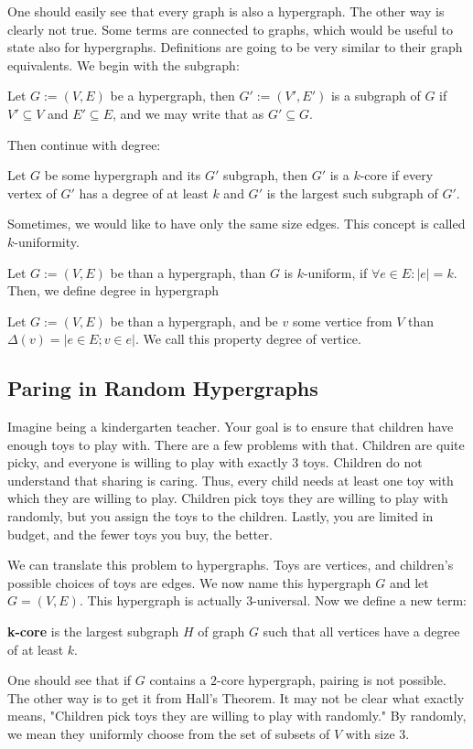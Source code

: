 One should easily see that every graph is also a hypergraph. The other way is clearly not true. Some terms are connected to graphs, which would be useful to state also for hypergraphs. Definitions are going to be very similar to their graph equivalents. We begin with the subgraph:

\begin{defn}
    Let \(G:= (V, E)\) be a hypergraph, then \(G':= (V',E')\) is a subgraph of \(G\) if \(V'\subseteq V\) and \(E' \subseteq E\), and we may write that as \(G' \subseteq G\).
\end{defn}

Then continue with degree:

\begin{defn}
    Let \(G\) be some hypergraph and its \(G'\) subgraph, then \(G'\) is a \(k\)-core if every vertex of \(G'\) has a degree of at least \(k\) and \(G'\) is the largest such subgraph of \(G'\).
\end{defn}

Sometimes, we would like to have only the same size edges. This concept is called $k$-uniformity.
\begin{defn}
    Let \(G:= (V, E)\) be than a hypergraph, than $G$ is $k$-uniform, if $\forall e \in E : |e| = k$.
    Then, we define degree in hypergraph
\end{defn}

\begin{defn}
    Let \(G:= (V, E)\) be than a hypergraph, and be $v$ some vertice from $V$ than $\Delta(v) = |{e \in E; v\in e }|$. We call this property degree of vertice.
\end{defn}


\subsection{Paring in Random Hypergraphs}
Imagine being a kindergarten teacher. Your goal is to ensure that children have enough toys to play with. 
There are a few problems with that. Children are quite picky, and everyone is willing to play with exactly 3 toys.
 Children do not understand that sharing is caring. Thus, every child needs at least one toy with which they are willing to play. Children pick toys they are willing to play with randomly, but you assign the toys to the children. Lastly, you are limited in budget, and the fewer toys you buy, the better.

We can translate this problem to hypergraphs. Toys are vertices, and children's possible choices of toys are edges. We now name this hypergraph $G$ and let $G = (V, E)$. This hypergraph is actually $3$-universal. Now we define a new term:
\begin{defn}
   \textbf{k-core} is the largest subgraph \( H \) of graph \( G \) such that all vertices have a degree of at least \( k \). 
\end{defn}
One should see that if $G$ contains a $2$-core hypergraph, pairing is not possible. The other way is to get it from Hall's Theorem. It may not be clear what exactly means, "Children pick toys they are willing to play with randomly." By randomly, we mean they uniformly choose from the set of subsets of $V$ with size $3$.

